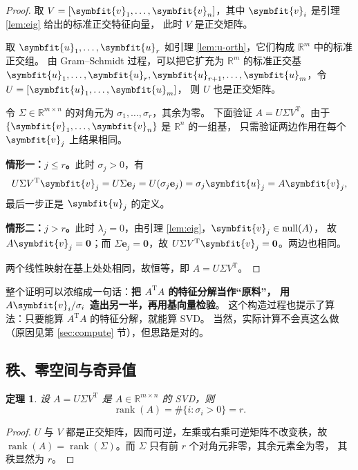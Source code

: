 \documentclass[UTF8, 11pt, a4paper, fontset=windows]{ctexart}
\theoremstyle{cnthm}
\newtheorem{thm}{定理}[section]
\theoremstyle{cndef}
\newcommand{\T}{^{\mathrm{T}}}
\newcommand{\R}{\mathbb{R}}
\DeclareMathOperator{\rank}{rank}
\DeclareMathOperator{\Null}{null}
\newcommand{\bu}{\symbfit{u}}
\newcommand{\vv}{\symbfit{v}}
\begin{document}
\begin{proof}
取 $V=[\vv_1,\dots,\vv_n]$，其中 $\vv_i$ 是引理 \ref{lem:eig} 给出的标准正交特征向量，
此时 $V$ 是正交矩阵。

取 $\bu_1,\dots,\bu_r$ 如引理 \ref{lem:u-orth}，它们构成 $\R^m$ 中的标准正交组。
由 Gram--Schmidt 过程，可以把它扩充为 $\R^m$ 的标准正交基
$\bu_1,\dots,\bu_r,\bu_{r+1},\dots,\bu_m$，令 $U=[\bu_1,\dots,\bu_m]$，
则 $U$ 也是正交矩阵。

令 $\Sigma\in\R^{m\times n}$ 的对角元为 $\sigma_1,\dots,\sigma_r$，其余为零。
下面验证 $A=U\Sigma V\T$。由于 $\{\vv_1,\dots,\vv_n\}$ 是 $\R^n$ 的一组基，
只需验证两边作用在每个 $\vv_j$ 上结果相同。

\textbf{情形一：$j\le r$。}此时 $\sigma_j>0$，有
\begin{equation}
  U\Sigma V\T\vv_j=U\Sigma\mathbf{e}_j=U(\sigma_j\mathbf{e}_j)=\sigma_j\bu_j=A\vv_j ,
\end{equation}
最后一步正是 $\bu_j$ 的定义。

\textbf{情形二：$j>r$。}此时 $\lambda_j=0$，由引理 \ref{lem:eig}，$\vv_j\in\Null(A)$，
故 $A\vv_j=\mathbf{0}$；而 $\Sigma\mathbf{e}_j=\mathbf{0}$，故
$U\Sigma V\T\vv_j=\mathbf{0}$。两边也相同。

两个线性映射在基上处处相同，故恒等，即 $A=U\Sigma V\T$。
\end{proof}

\begin{keybox}[证明的结构]
整个证明可以浓缩成一句话：\textbf{把 $A\T A$ 的特征分解当作“原料”，
用 $A\vv_i/\sigma_i$ 造出另一半，再用基向量检验}。
这个构造过程也提示了算法：只要能算 $A\T A$ 的特征分解，就能算 SVD。
当然，实际计算不会真这么做（原因见第 \ref{sec:compute} 节），但思路是对的。
\end{keybox}

\subsection{秩、零空间与奇异值}

\begin{thm}\label{thm:rank-sv}
设 $A=U\Sigma V\T$ 是 $A\in\R^{m\times n}$ 的 SVD，则
\begin{equation}
  \rank(A)=\#\{i:\sigma_i>0\}=r .
\end{equation}
\end{thm}

\begin{proof}
$U$ 与 $V$ 都是正交矩阵，因而可逆，左乘或右乘可逆矩阵不改变秩，故
$\rank(A)=\rank(\Sigma)$。而 $\Sigma$ 只有前 $r$ 个对角元非零，其余元素全为零，
其秩显然为 $r$。
\end{proof}
\end{document}
